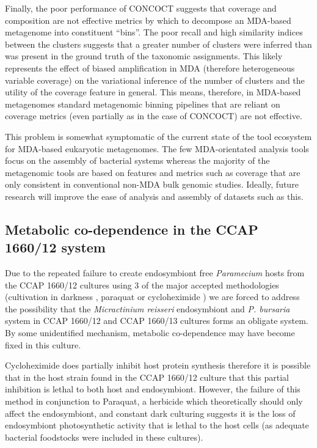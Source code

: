 Finally, the poor performance of CONCOCT suggests that coverage and composition
are not effective metrics by which to decompose an MDA-based metagenome
into constituent ``bins''.  The poor recall and high similarity indices between
the clusters suggests that a greater number of clusters were inferred than was present
in the ground truth of the taxonomic assignments.  This likely represents the effect of
biased amplification in MDA (therefore heterogeneous variable coverage) on
the variational inference of the number of clusters and the utility of the coverage 
feature in general.  This means, therefore, in MDA-based metagenomes standard metagenomic
binning pipelines that are reliant on coverage metrics (even partially as in the case
of CONCOCT) are not effective. 

This problem is somewhat symptomatic of the current state of the tool ecosystem
for MDA-based eukaryotic metagenomes. The few MDA-orientated analysis
tools focus on the assembly of bacterial systems whereas the majority of the metagenomic
tools are based on features and metrics such as coverage that are only
consistent in conventional non-MDA bulk genomic studies. 
Ideally, future research will improve the ease of analysis and assembly
of datasets such as this.

\subsection{Metabolic co-dependence in the CCAP 1660/12 system}

Due to the repeated failure to create endosymbiont free \textit{Paramecium}
hosts from the CCAP 1660/12 cultures using 3 of the major accepted
methodologies (cultivation in darkness \citep{Karakashian1963},
paraquat \citep{Hosoya1995a,Tanaka2002} or cycloheximide \citep{weis1984effect})
we are forced to address the possibility that the \textit{Micractinium reisseri}
endosymbiont and \textit{P. bursaria} system in CCAP 1660/12 and CCAP 1660/13
cultures forms an obligate system.  By some unidentified mechanism, metabolic
co-dependence may have become fixed in this culture. 

Cycloheximide does partially inhibit host protein synthesis
\citep{weis1984effect,Kodama2007,Kodama2008,Kodama2009a}
therefore it is possible that in the host strain found in the
CCAP 1660/12 culture that this partial inhibition is lethal to both
host and endosymbiont. However, the failure of this method in conjunction
to Paraquat, a herbicide which theoretically should only affect the endosymbiont, 
and constant dark culturing suggests it is the loss of endosymbiont
photosynthetic activity that is lethal to the host cells (as adequate bacterial
foodstocks were included in these cultures).   


